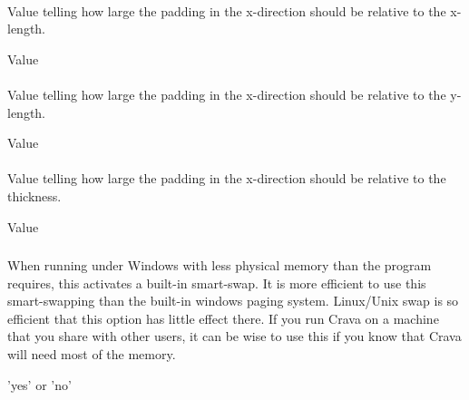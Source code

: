 \paragraph{}
 \slist
   \item \Description Value telling how large the padding in the x-direction should be relative to the x-length. %
   \item \Argument Value
   \item {}
 \elist

\paragraph{}
 \slist
   \item \Description Value telling how large the padding in the x-direction should be relative to the y-length.
   \item \Argument Value
   \item {}
 \elist

\paragraph{}
 \slist
   \item \Description Value telling how large the padding in the x-direction should be relative to the thickness.
   \item \Argument Value
   \item {}
 \elist

\subsubsection{} 
 \slist
   \item \Description When running under Windows with less physical
     memory than the program requires, this activates a built-in
     smart-swap. It is more efficient to use this smart-swapping than
     the built-in windows paging system. Linux/Unix swap is so
     efficient that this option has little effect there. If you run
     Crava on a machine that you share with other users, it can be
     wise to use this if you know that Crava will need most of the
     memory.
   \item \Argument 'yes' or 'no'
   \item \Default
 \elist

